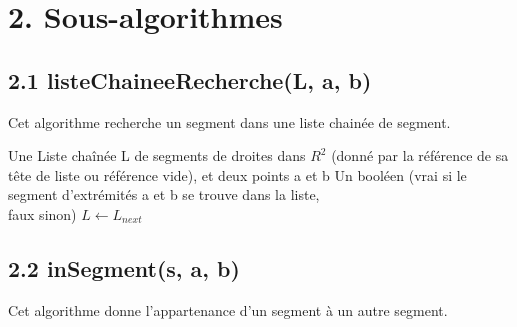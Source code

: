 \documentclass[a4paper,12pt]{report}	%
\begin{document}
	
	\newpage

	{\section*{2. Sous-algorithmes}}
	
	{\subsection*{2.1 listeChaineeRecherche(L, a, b)}}
	
	\noindent Cet algorithme recherche un segment dans une liste chainée de segment.

	\begin{algorithm}
	\caption{$listeChaineeRecherche(L, a, b)$}
	\label{Modele pour un algo}
	\begin{algorithmic} [1]
	\REQUIRE Une Liste chaînée L de segments de droites dans $R^2$ (donné par la référence de sa tête de liste ou référence vide), et deux points a et b
	\ENSURE Un booléen (vrai si le segment d’extrémités a et b se trouve dans la liste, \\faux sinon)
	\RETURN \FALSE
	\ELSE
	\RETURN \TRUE
	\ENDIF
	\STATE $L \gets L_{next}$
	\ENDWHILE
	\RETURN \FALSE
	\ENDIF
	\end{algorithmic}
	\end{algorithm}
	
	\newpage
	
	{\subsection*{2.2 inSegment(s, a, b)}}
	
	\noindent Cet algorithme donne l'appartenance d'un segment à un autre segment.
	
\end{document}
